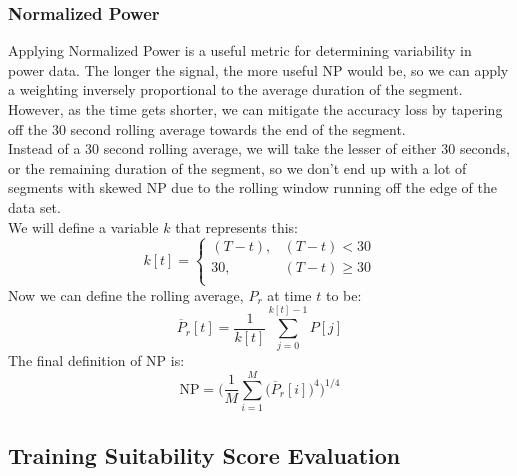 \documentclass[12pt,a4paper]{report}
\begin{document}
\subsubsection{Normalized Power}
Applying Normalized Power is a useful metric for determining variability in power data. The longer the signal, the more useful NP would be, so
we can apply a weighting inversely proportional to the average duration of the segment.
However, as the time gets shorter, we can mitigate the accuracy loss by tapering off the 30 second rolling average towards the end of the segment.
\\
Instead of a 30 second rolling average, we will take the lesser of either 30 seconds, or the remaining duration of the segment, so we don't end up
with a lot of segments with skewed NP due to the rolling window running off the edge of the data set.\\

We will define a variable $k$ that represents this:
\[
	k[t] = \begin{cases}
		(T-t), & (T-t) < 30   \\
		30,    & (T-t) \ge 30 \\
	\end{cases}
\]
Now we can define the rolling average, ${P}_{r}$ at time $t$ to be:
\[
	\overline{P}_{r}[t] = \frac{1}{k[t]} \sum_{j=0}^{k[t]-1} P[j]
\]
The final definition of NP is:
\[
	\mathrm{NP} = \bigg( \frac{1}{M} \sum_{i=1}^{M}\big(\overline{P}_{r}[i]\big)^{4}\bigg)^{1/4}
\]


\subsection{Training Suitability Score Evaluation}
\end{document}
